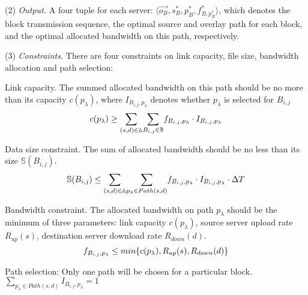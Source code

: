 \noindent(2) {\em Output.} A four tuple for each server: $\langle \overrightarrow{o_B}, s_{B}^*, p_{B}^*, f^*_{B,p_{B}^*} \rangle$, which denotes the block transmission sequence, the optimal source and overlay path for each block, and the optimal allocated bandwidth on this path, respectively.

\noindent(3) {\em Constraints.}
There are four constraints on link capacity, file size, bandwidth allocation and path selection:

\begin{packeditemize}
\item Link capacity. The summed allocated bandwidth on this path should be no more than its capacity $c(p_\lambda)$, where $I_{B_{i,j},p_\lambda}$ denotes whether $p_\lambda$ is selected for $B_{i,j}$
\begin{equation}
c(p_\lambda) \geq  \displaystyle{\sum_{(s,d)\in \mathbb{A}}} \displaystyle{\sum_{B_{i,j} \in \mathbb{B}}} f_{B_{i,j},p_\lambda} \cdot I_{B_{i,j},p_\lambda}\\
\end{equation}

\item Data size constraint. The sum of allocated bandwidth should be no less than its size $\mathbb{S}(B_{i,j})$.
\begin{equation}
\mathbb{S}(B_{i,j}) \leq  \displaystyle{\sum_{(s,d)\in \mathbb{A}}} \displaystyle{\sum_{p_{\lambda}\in Path(s,d)}} f_{B_{i,j},p_\lambda} \cdot I_{B_{i,j},p_\lambda} \cdot \Delta T\\
\end{equation}

\item Bandwidth constraint. The allocated bandwidth on path $p_\lambda$ should be the minimum of three parameters: link capacity $c(p_\lambda)$, source server upload rate $R_{up}(s)$, destination server download rate $R_{down}(d)$.
\begin{equation}
f_{B_{i,j},p_\lambda} \leq  min \{c(p_\lambda),R_{up}(s),R_{down}(d)\}\\
\end{equation}

\item Path selection: Only one path will be chosen for a particular block.
$\displaystyle{\sum_{p_\lambda \in Path(s,d)}} I_{B_{i,j},p_\lambda} = 1$
\end{packeditemize}
